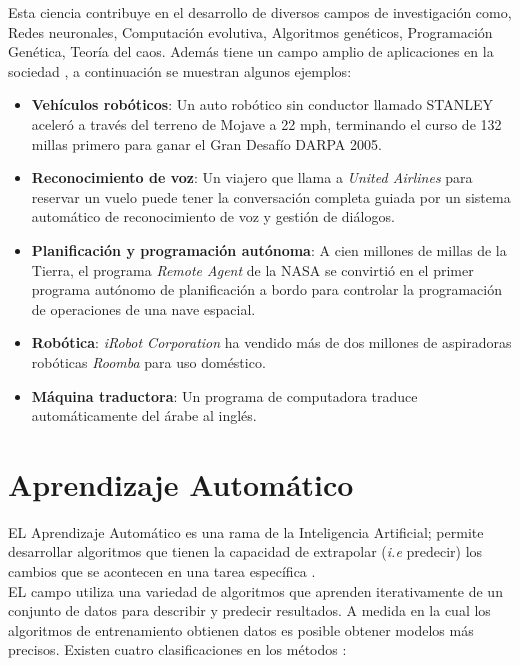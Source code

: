Esta ciencia contribuye en el desarrollo de diversos campos de investigación como, Redes neuronales, Computación evolutiva, Algoritmos genéticos, Programación Genética, Teoría del caos. Además tiene un campo amplio de aplicaciones en la sociedad \citep{CT20}, a continuación se muestran algunos ejemplos:

\begin{itemize}
	\item \textbf{Vehículos robóticos}: Un auto robótico sin conductor llamado STANLEY aceleró a través del terreno de Mojave a 22 mph, terminando el curso de 132 millas primero para ganar el Gran Desafío DARPA 2005.

	\item \textbf{Reconocimiento de voz}: Un viajero que llama a \textit{United Airlines} para reservar un vuelo puede tener la conversación completa guiada por un sistema automático de reconocimiento de voz y gestión de diálogos.

	\item \textbf{Planificación y programación autónoma}: A cien millones de millas de la Tierra, el programa \textit{Remote Agent} de la NASA se convirtió en el primer programa autónomo de planificación a bordo para controlar la programación de operaciones de una nave espacial.

	\item \textbf{Robótica}: \textit{iRobot Corporation} ha vendido más de dos millones de aspiradoras robóticas \textit{Roomba} para uso doméstico.

	\item \textbf{Máquina traductora}: Un programa de computadora  traduce automáticamente del árabe al inglés.

\end{itemize} 

\section{Aprendizaje Automático}

EL Aprendizaje Automático es una rama de la Inteligencia Artificial; permite desarrollar algoritmos que tienen la capacidad de extrapolar (\textit{i.e} predecir) los cambios que se acontecen en una tarea específica \citep{CT2}.\\

EL campo utiliza una variedad de algoritmos que aprenden iterativamente de un conjunto de
datos para describir y predecir resultados. A medida en la cual los algoritmos de 
entrenamiento obtienen datos es posible obtener modelos más precisos. Existen cuatro clasificaciones en los métodos \citep{CT21}:

